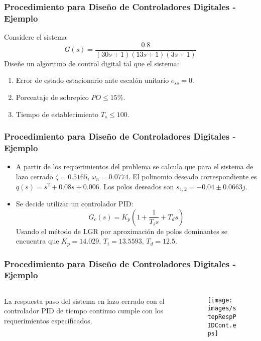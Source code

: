 \documentclass[aspectratio=169,handout]{beamer}
\theoremstyle{definition}
\theoremstyle{plain}
\theoremstyle{remark}
\begin{document}
\begin{frame}[c]\frametitle{Procedimiento para Diseño de Controladores Digitales - Ejemplo}
	Considere el sistema 
	\begin{equation*}
		G(s) = \frac{0.8}{(30s+1)(13s+1)(3s+1)}
	\end{equation*}
	Diseñe un algoritmo de control digital tal que el sistema:
	\begin{enumerate}
		\item Error de estado estacionario ante escalón unitario $e_{ss} = 0$.
		\item Porcentaje de sobrepico $PO \leq 15\%$.
		\item Tiempo de establecimiento $T_s \leq 100$.
	\end{enumerate}
\end{frame}

\begin{frame}[c]\frametitle{Procedimiento para Diseño de Controladores Digitales - Ejemplo}
	\begin{itemize}
		\item A partir de los requerimientos del problema se calcula que para el sistema de lazo cerrado $\zeta = 0.5165$, $\omega_n = 0.0774$.
		\pause
		El polinomio deseado correspondiente es $q(s) = s^2 +0.08s + 0.006$.
		\pause
		Los polos deseados son $s_{1,2} = -0.04 \pm 0.0663j$.
		\pause
		\item Se decide utilizar un controlador PID:
		\begin{equation*}
			G_c(s) = K_p \left(1 + \frac{1}{T_i s} + T_d s\right)
		\end{equation*}
		\pause
		Usando el método de LGR por aproximación de polos dominantes se encuentra que $K_p = 14.029$, $T_i = 13.5593$, $T_d = 12.5$.
	\end{itemize}
\end{frame}

\begin{frame}[c]\frametitle{Procedimiento para Diseño de Controladores Digitales - Ejemplo}
	\vspace*{1.7mm}
	\begin{columns}
		\begin{column}{0.3\textwidth}
			La respuesta paso del sistema en lazo cerrado con el controlador PID de tiempo continuo cumple con los requerimientos especificados.
		\end{column}
		\begin{column}{0.7\textwidth}
		\begin{figure}
			\centering
			\texttt{[image: images/stepRespPIDCont.eps]}
		\end{figure}
		\end{column}
	\end{columns}
\end{frame}
\end{document}
